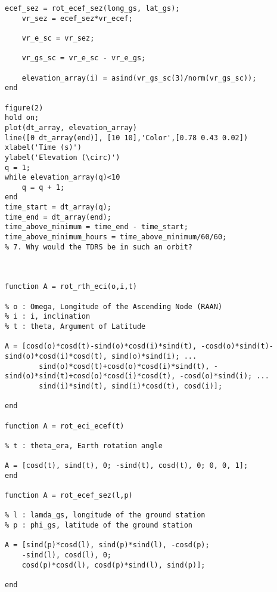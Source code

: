 \begin{lstlisting}[frame=lines,style=Matlab-editor,basicstyle = \mlttfamily]
    ecef_sez = rot_ecef_sez(long_gs, lat_gs);
    vr_sez = ecef_sez*vr_ecef;

    vr_e_sc = vr_sez;

    vr_gs_sc = vr_e_sc - vr_e_gs;

    elevation_array(i) = asind(vr_gs_sc(3)/norm(vr_gs_sc));
end

figure(2)
hold on;
plot(dt_array, elevation_array)
line([0 dt_array(end)], [10 10],'Color',[0.78 0.43 0.02])
xlabel('Time (s)')
ylabel('Elevation (\circ)')
q = 1;
while elevation_array(q)<10
    q = q + 1;
end
time_start = dt_array(q);
time_end = dt_array(end);
time_above_minimum = time_end - time_start;
time_above_minimum_hours = time_above_minimum/60/60;
% 7. Why would the TDRS be in such an orbit?



function A = rot_rth_eci(o,i,t)

% o : Omega, Longitude of the Ascending Node (RAAN)
% i : i, inclination
% t : theta, Argument of Latitude

A = [cosd(o)*cosd(t)-sind(o)*cosd(i)*sind(t), -cosd(o)*sind(t)-sind(o)*cosd(i)*cosd(t), sind(o)*sind(i); ...
        sind(o)*cosd(t)+cosd(o)*cosd(i)*sind(t), -sind(o)*sind(t)+cosd(o)*cosd(i)*cosd(t), -cosd(o)*sind(i); ...
        sind(i)*sind(t), sind(i)*cosd(t), cosd(i)];

end

function A = rot_eci_ecef(t)

% t : theta_era, Earth rotation angle

A = [cosd(t), sind(t), 0; -sind(t), cosd(t), 0; 0, 0, 1];
end

function A = rot_ecef_sez(l,p)

% l : lamda_gs, longitude of the ground station
% p : phi_gs, latitude of the ground station

A = [sind(p)*cosd(l), sind(p)*sind(l), -cosd(p);
    -sind(l), cosd(l), 0;
    cosd(p)*cosd(l), cosd(p)*sind(l), sind(p)];

end
\end{lstlisting}
